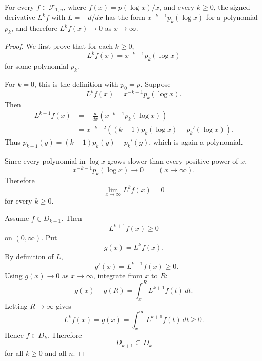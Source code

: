 \begin{proposition}
\label{res:log-function-signed-derivative-tail-vanishing}
For every \(f\in\mathcal F_{1,n}\), where \(f(x)=p(\log x)/x\), and every \(k\ge0\), the signed derivative \(L^k f\) with \(L=-d/dx\) has the form \(x^{-k-1}p_k(\log x)\) for a polynomial \(p_k\), and therefore \(L^k f(x)\to0\) as \(x\to\infty\).
\end{proposition}
\begin{proof}
We first prove that for each \(k\ge0\),
\[
L^k f(x)=x^{-k-1}p_k(\log x)
\]
for some polynomial \(p_k\).

For \(k=0\), this is the definition with \(p_0=p\).  Suppose
\[
L^k f(x)=x^{-k-1}p_k(\log x).
\]
Then
\[
\begin{aligned}
L^{k+1}f(x)
&=-\frac{d}{dx}\left(x^{-k-1}p_k(\log x)\right)\\
&=x^{-k-2}\left((k+1)p_k(\log x)-p_k'(\log x)\right).
\end{aligned}
\]
Thus \(p_{k+1}(y)=(k+1)p_k(y)-p_k'(y)\), which is again a polynomial.

Since every polynomial in \(\log x\) grows slower than every positive power of \(x\),
\[
x^{-k-1}p_k(\log x)\to0
\qquad (x\to\infty).
\]
Therefore
\[
\lim_{x\to\infty}L^k f(x)=0
\]
for every \(k\ge0\).

Assume \(f\in D_{k+1}\).  Then
\[
L^{k+1}f(x)\ge0
\]
on \((0,\infty)\).  Put
\[
g(x)=L^k f(x).
\]
By definition of \(L\),
\[
-g'(x)=L^{k+1}f(x)\ge0.
\]
Using \(g(x)\to0\) as \(x\to\infty\), integrate from \(x\) to \(R\):
\[
g(x)-g(R)=\int_x^R L^{k+1}f(t)\,dt.
\]
Letting \(R\to\infty\) gives
\[
L^k f(x)=g(x)=\int_x^\infty L^{k+1}f(t)\,dt\ge0.
\]
Hence \(f\in D_k\).  Therefore
\[
D_{k+1}\subseteq D_k
\]
for all \(k\ge0\) and all \(n\).
\end{proof}
